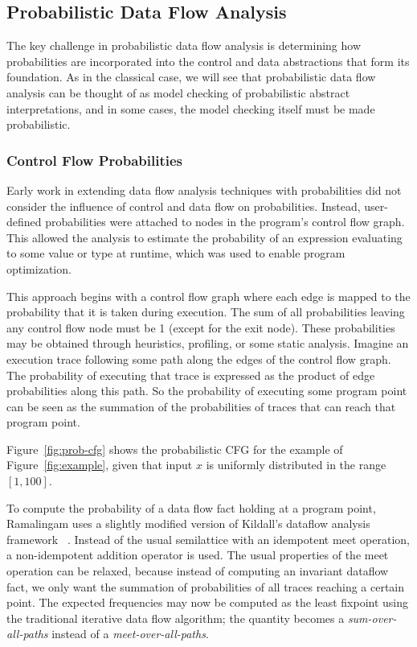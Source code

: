 \subsection{Probabilistic Data Flow Analysis}
\label{sec:pdfa}

The key challenge in probabilistic data flow analysis is
determining how probabilities are incorporated into the control
and data abstractions that form its foundation.
As in the classical case, we will see that probabilistic data flow analysis
can be thought of as model checking
of probabilistic abstract interpretations, and in some
cases, the model checking itself must be made probabilistic.

\subsubsection{Control Flow Probabilities}
Early work in extending data flow analysis 
techniques with probabilities did not consider
the influence of control and data flow on probabilities.
Instead, user-defined probabilities 
were attached to nodes in the program's control flow graph.  
This allowed the analysis to estimate
the probability of an expression evaluating 
to some value or type at runtime, which was used to enable
program optimization.

This approach begins with a control flow graph where each edge is 
mapped to the probability that it is taken during execution.
The sum of all probabilities leaving any control flow node must be 1
(except for the exit node).
These probabilities may be obtained through heuristics, profiling,
or some static analysis.
Imagine an execution trace following some path along the edges of
the control flow graph.
The probability of executing that trace is expressed as the product of 
edge probabilities along this path.
So the probability of executing some program point can be seen as the
summation of the probabilities of traces that can reach that program point.


Figure~\ref{fig:prob-cfg} shows the probabilistic CFG for the
example of Figure~\ref{fig:example}, given that input $x$
is uniformly distributed in the range $[1,100]$.

To compute the probability of a data flow fact holding 
at a program point, Ramalingam uses a slightly
modified version of Kildall's dataflow analysis framework
~\cite{ramalingam1996data}.
Instead of the usual semilattice with an idempotent meet
operation, a non-idempotent addition operator is used.
The usual properties of the meet operation can be
relaxed, because instead of computing an invariant dataflow
fact, we only want the summation of probabilities of all
traces reaching a certain point.
The expected frequencies may now be computed as the least
fixpoint using the traditional iterative data flow algorithm;
the quantity becomes a
{\sl sum-over-all-paths} instead of a {\sl meet-over-all-paths}.

